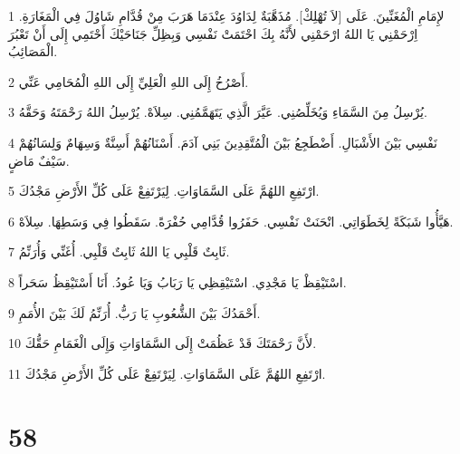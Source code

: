 \par 1 لإِمَامِ الْمُغَنِّينَ. عَلَى [لاَ تُهْلِكْ]. مُذَهَّبَةٌ لِدَاوُدَ عِنْدَمَا هَرَبَ مِنْ قُدَّامِ شَاوُلَ فِي الْمَغَارَةِ. اِرْحَمْنِي يَا اللهُ ارْحَمْنِي لأَنَّهُ بِكَ احْتَمَتْ نَفْسِي وَبِظِلِّ جَنَاحَيْكَ أَحْتَمِي إِلَى أَنْ تَعْبُرَ الْمَصَائِبُ.
\par 2 أَصْرُخُ إِلَى اللهِ الْعَلِيِّ إِلَى اللهِ الْمُحَامِي عَنِّي.
\par 3 يُرْسِلُ مِنَ السَّمَاءِ وَيُخَلِّصُنِي. عَيَّرَ الَّذِي يَتَهَمَّمُنِي. سِلاَهْ. يُرْسِلُ اللهُ رَحْمَتَهُ وَحَقَّهُ.
\par 4 نَفْسِي بَيْنَ الأَشْبَالِ. أَضْطَجِعُ بَيْنَ الْمُتَّقِدِينَ بَنِي آدَمَ. أَسْنَانُهُمْ أَسِنَّةٌ وَسِهَامٌ وَلِسَانُهُمْ سَيْفٌ مَاضٍ.
\par 5 ارْتَفِعِ اللهُمَّ عَلَى السَّمَاوَاتِ. لِيَرْتَفِعْ عَلَى كُلِّ الأَرْضِ مَجْدُكَ.
\par 6 هَيَّأُوا شَبَكَةً لِخَطَوَاتِي. انْحَنَتْ نَفْسِي. حَفَرُوا قُدَّامِي حُفْرَةً. سَقَطُوا فِي وَسَطِهَا. سِلاَهْ.
\par 7 ثَابِتٌ قَلْبِي يَا اللهُ ثَابِتٌ قَلْبِي. أُغَنِّي وَأُرَنِّمُ.
\par 8 اسْتَيْقِظْ يَا مَجْدِي. اسْتَيْقِظِي يَا رَبَابُ وَيَا عُودُ. أَنَا أَسْتَيْقِظُ سَحَراً.
\par 9 أَحْمَدُكَ بَيْنَ الشُّعُوبِ يَا رَبُّ. أُرَنِّمُ لَكَ بَيْنَ الأُمَمِ.
\par 10 لأَنَّ رَحْمَتَكَ قَدْ عَظُمَتْ إِلَى السَّمَاوَاتِ وَإِلَى الْغَمَامِ حَقُّكَ.
\par 11 ارْتَفِعِ اللهُمَّ عَلَى السَّمَاوَاتِ. لِيَرْتَفِعْ عَلَى كُلِّ الأَرْضِ مَجْدُكَ.

\chapter{58}

